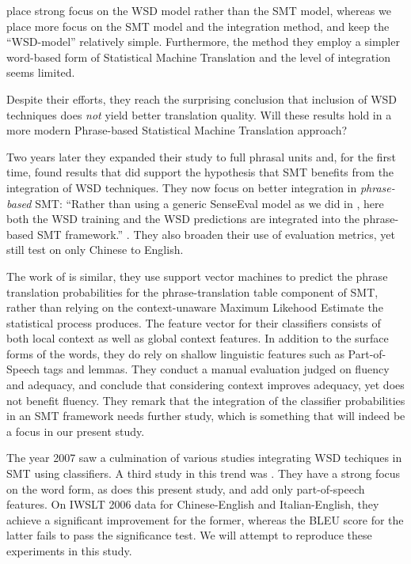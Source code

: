 \documentclass[11pt]{article}
\begin{document}
\cite{CarpuatWu05} place strong focus on the WSD model rather than the SMT
model, whereas we place more focus on the SMT model and the integration method,
and keep the ``WSD-model'' relatively simple. Furthermore, the method they
employ a simpler word-based form of Statistical Machine Translation and the
level of integration seems limited.

Despite their efforts, they reach the surprising conclusion that inclusion of
WSD techniques does \emph{not} yield better translation quality. Will these
results hold in a more modern Phrase-based Statistical Machine Translation
approach?

Two years later they expanded their study to full phrasal units
\citep{CarpuatWu07} and, for the first time, found results that did support the
hypothesis that SMT benefits from the integration of WSD techniques. They now
focus on better integration in \emph{phrase-based} SMT: ``Rather than using a
generic SenseEval model as we did in \cite{CarpuatWu05}, here both the WSD
training and the WSD predictions are integrated into the phrase-based SMT
framework.'' \citep{CarpuatWu07}. They also broaden their use of evaluation
metrics, yet still test on only Chinese to English.

The work of \cite{Gimenez+07} is similar, they use support vector machines to
predict the phrase translation probabilities for the phrase-translation table
component of SMT, rather than relying on the context-unaware Maximum Likehood
Estimate the statistical process produces. The feature vector for their
classifiers consists of both local context as well as global context features.
In addition to the surface forms of the words, they do rely on shallow
linguistic features such as Part-of-Speech tags and lemmas. They conduct a
manual evaluation judged on fluency and adequacy, and conclude that considering
context improves adequacy, yet does not benefit fluency. They remark that the
integration of the classifier probabilities in an SMT framework needs further
study, which is something that will indeed be a focus in our present study.

The year 2007 saw a culmination of various studies integrating WSD techiques in
SMT using classifiers. A third study in this trend was \cite{Stroppa+07}. They
have a strong focus on the word form, as does this present study, and add only
part-of-speech features. On IWSLT 2006 data for Chinese-English and
Italian-English, they achieve a significant improvement for the former, whereas
the BLEU score for the latter fails to pass the significance test. We will
attempt to reproduce these experiments in this study.
\end{document}
